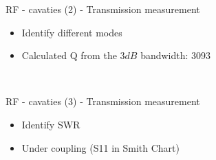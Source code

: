 \documentclass{beamer}
\begin{document}
\begin{frame}[t,fragile]{RF - cavaties (2) - Transmission measurement}
\begin{itemize}
\item Identify different modes 
\item Calculated Q from the $3 dB$ bandwidth: $3093$
\begin{figure}
  \centering
  \quad
  \\
\end{figure}
\end{itemize}
\end{frame}

\begin{frame}[t,fragile]{RF - cavaties (3) - Transmission measurement}
\begin{itemize}
\item Identify SWR
\item Under coupling (S11 in Smith Chart)
\begin{figure}
  \centering
  \quad
  \\
\end{figure}
\end{itemize}
\end{frame}
\end{document}
